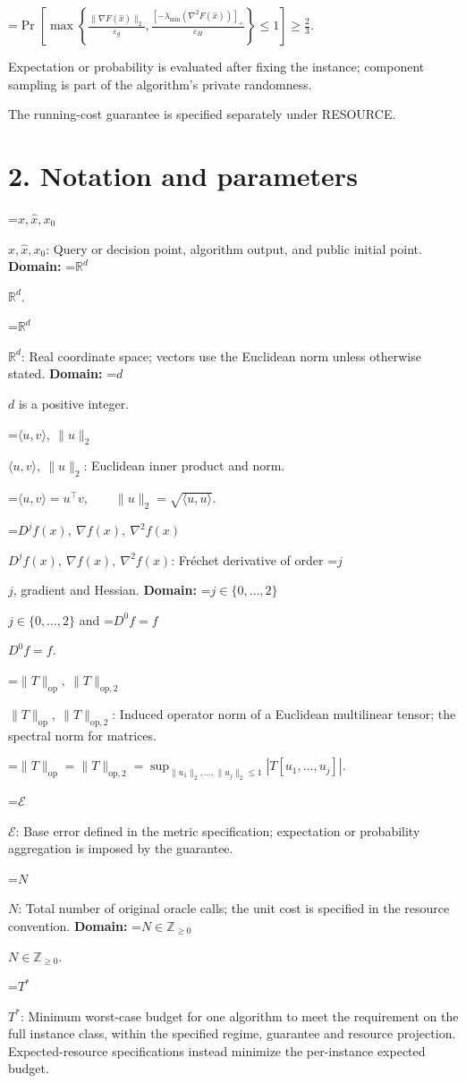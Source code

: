 \documentclass[10pt,a4paper]{article}
\newcommand{\AtlasMath}[1]{\par\begingroup\centering\setbox0=\hbox{$\displaystyle #1$}\ifdim\wd0>1.4\linewidth\typeout{ATLAS WIDE FORMULA: \the\wd0}\fi\ifdim\wd0>\linewidth\resizebox{\linewidth}{!}{\box0}\else\box0\fi\par\endgroup}
\newcommand{\AtlasInlineMath}[1]{\begingroup\setbox0=\hbox{$#1$}\ifdim\wd0>.4\linewidth\endgroup\AtlasMath{#1}\else\endgroup$#1$\fi}
\begin{document}
\AtlasMath{\Pr\!\left[\max\left\{\frac{\|\nabla F(\widehat{x})\|_2}{\varepsilon_g},\frac{[-\lambda_{\min}(\nabla^2F(\widehat{x}))]_+}{\varepsilon_H}\right\}\le 1\right]\ge\frac23.}


Expectation or probability is evaluated after fixing the instance; component sampling is part of the algorithm's private randomness.

The running-cost guarantee is specified separately under RESOURCE.

\section{2. Notation and parameters}
\AtlasInlineMath{x,\widehat{x},x_0}: Query or decision point, algorithm output, and public initial point. \textbf{Domain:} \AtlasInlineMath{\mathbb{R}^d}.

\AtlasInlineMath{\mathbb{R}^d}: Real coordinate space; vectors use the Euclidean norm unless otherwise stated. \textbf{Domain:} \AtlasInlineMath{d} is a positive integer.

\AtlasInlineMath{\langle u,v\rangle,\ \|u\|_2}: Euclidean inner product and norm.


\AtlasMath{\langle u,v\rangle=u^\top v,\qquad\|u\|_2=\sqrt{\langle u,u\rangle}.}


\AtlasInlineMath{D^jf(x),\ \nabla f(x),\ \nabla^2f(x)}: Fréchet derivative of order \AtlasInlineMath{j}, gradient and Hessian. \textbf{Domain:} \AtlasInlineMath{j\in\{0,\ldots,2\}} and \AtlasInlineMath{D^0f=f}.

\AtlasInlineMath{\|T\|_{\mathrm{op}},\ \|T\|_{\mathrm{op},2}}: Induced operator norm of a Euclidean multilinear tensor; the spectral norm for matrices.


\AtlasMath{\|T\|_{\mathrm{op}}=\|T\|_{\mathrm{op},2}=\sup_{\|u_1\|_2,\ldots,\|u_j\|_2\le1}|T[u_1,\ldots,u_j]|.}


\AtlasInlineMath{\mathcal{E}}: Base error defined in the metric specification; expectation or probability aggregation is imposed by the guarantee.

\AtlasInlineMath{N}: Total number of original oracle calls; the unit cost is specified in the resource convention. \textbf{Domain:} \AtlasInlineMath{N\in\mathbb{Z}_{\ge0}}.

\AtlasInlineMath{T^*}: Minimum worst-case budget for one algorithm to meet the requirement on the full instance class, within the specified regime, guarantee and resource projection. Expected-resource specifications instead minimize the per-instance expected budget.
\end{document}

